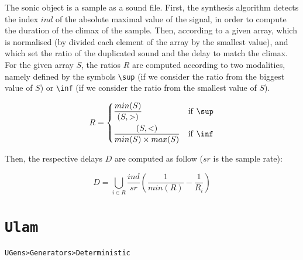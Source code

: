 \bigskip
The sonic object is a sample as a sound file. First, the synthesis algorithm detects the index $ind$ of the absolute maximal value of the signal, in order to compute the duration of the climax of the sample. Then, according to a given array, which is normalised (by divided each element of the array by the smallest value), and which set the ratio of the duplicated sound and the delay to match the climax. For the given array $S$, the ratios $R$ are computed according to two modalities, namely defined by the symbols \texttt{\textbackslash sup} (if we consider the ratio from the biggest value of $S$) or \texttt{\textbackslash inf} (if we consider the ratio from the smallest value of $S$).

\[
     R =
\begin{dcases}
	\frac{min(S)}{(S, >)}  & \text{if \texttt{\textbackslash sup}}\\
	\frac{(S, <)}{min(S) \times max(S)}  & \text{if \texttt{\textbackslash inf}} 
   \end{dcases}
\]

\bigskip
Then, the respective delays $D$ are computed as follow ($sr$ is the sample rate):
 
\[
D = \bigcup_{i \in R} \frac{ind}{sr}  \left( \frac{1}{min(R)} - \frac{1}{R_i} \right)
\]


\section{\texttt{Ulam}}
\label{colz}

\texttt{UGens>Generators>Deterministic}

\bigskip

%
%
%
%
%
%
%

